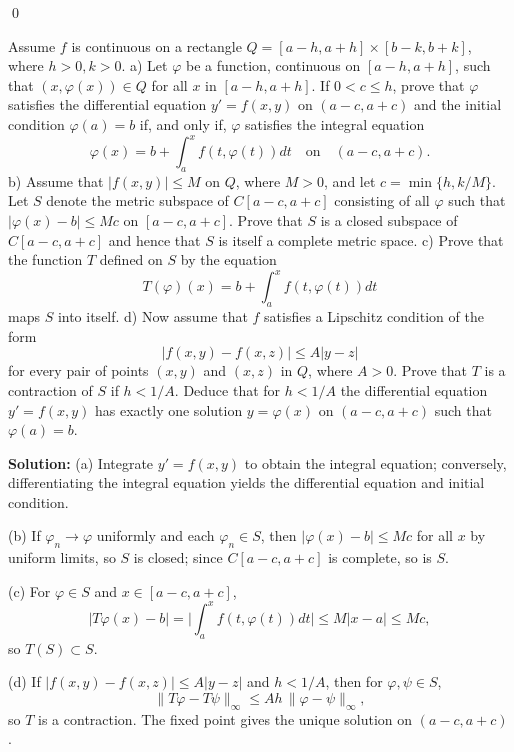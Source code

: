 \qed
\begin{problembox}
Assume $f$ is continuous on a rectangle $Q = [a - h, a + h] \times [b - k, b + k]$, where $h > 0, k > 0$.
a) Let $\varphi$ be a function, continuous on $[a - h, a + h]$, such that $(x, \varphi(x)) \in Q$ for all $x$ in $[a - h, a + h]$. If $0 < c \leq h$, prove that $\varphi$ satisfies the differential equation $y' = f(x, y)$ on $(a - c, a + c)$ and the initial condition $\varphi(a) = b$ if, and only if, $\varphi$ satisfies the integral equation 
\[\varphi(x) = b + \int_a^x f(t, \varphi(t)) dt \quad \text{on} \quad (a - c, a + c).\]
b) Assume that $|f(x, y)| \leq M$ on $Q$, where $M > 0$, and let $c = \min \{h, k/M\}$. Let $S$ denote the metric subspace of $C[a - c, a + c]$ consisting of all $\varphi$ such that $|\varphi(x) - b| \leq Mc$ on $[a - c, a + c]$. Prove that $S$ is a closed subspace of $C[a - c, a + c]$ and hence that $S$ is itself a complete metric space.
c) Prove that the function $T$ defined on $S$ by the equation 
\[T(\varphi)(x) = b + \int_a^x f(t, \varphi(t)) dt\]
maps $S$ into itself.
d) Now assume that $f$ satisfies a Lipschitz condition of the form 
\[|f(x, y) - f(x, z)| \leq A|y - z|\]
for every pair of points $(x, y)$ and $(x, z)$ in $Q$, where $A > 0$. Prove that $T$ is a contraction of $S$ if $h < 1/A$. Deduce that for $h < 1/A$ the differential equation $y' = f(x, y)$ has exactly one solution $y = \varphi(x)$ on $(a - c, a + c)$ such that $\varphi(a) = b$.
\end{problembox}

\noindent\textbf{Solution:}
(a) Integrate $y'=f(x,y)$ to obtain the integral equation; conversely, differentiating the integral equation yields the differential equation and initial condition.

(b) If $\varphi_n\to\varphi$ uniformly and each $\varphi_n\in S$, then $|\varphi(x)-b|\le Mc$ for all $x$ by uniform limits, so $S$ is closed; since $C[a-c,a+c]$ is complete, so is $S$.

(c) For $\varphi\in S$ and $x\in[a-c,a+c]$,
\[|T\varphi(x)-b|=\Big|\int_a^x f(t,\varphi(t))dt\Big|\le M|x-a|\le Mc,
\]
so $T(S)\subset S$.

(d) If $|f(x,y)-f(x,z)|\le A|y-z|$ and $h<1/A$, then for $\varphi,\psi\in S$,
\[\|T\varphi-T\psi\|_\infty\le A h\,\|\varphi-\psi\|_\infty,
\]
so $T$ is a contraction. The fixed point gives the unique solution on $(a-c,a+c)$.
\medskip

